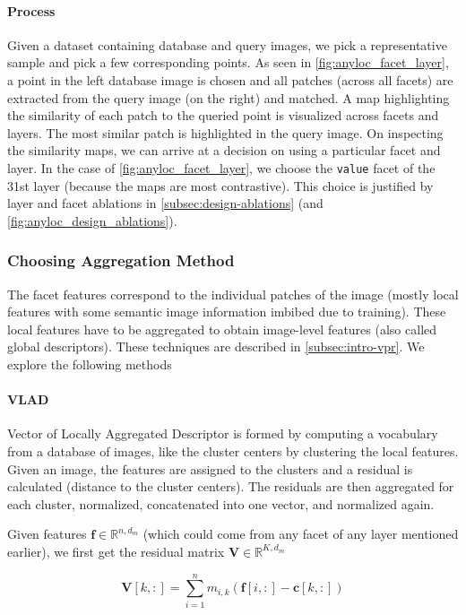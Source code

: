 \paragraph{Process} Given a dataset containing database and query
images, we pick a representative sample and pick a few corresponding
points. As seen in \cref{fig:anyloc_facet_layer}, a point in the left
database image is chosen and all patches (across all facets) are
extracted from the query image (on the right) and matched. A map
highlighting the similarity of each patch to the queried point is
visualized across facets and layers. The most similar patch is
highlighted in the query image. On inspecting the similarity maps, we
can arrive at a decision on using a particular facet and layer. In the
case of \cref{fig:anyloc_facet_layer}, we choose the \texttt{value}
facet of the 31st layer (because the maps are most contrastive). This
choice is justified by layer and facet ablations in
\cref{subsec:design-ablations} (and
\cref{fig:anyloc_design_ablations}).


\subsubsection{Choosing Aggregation Method}

The facet features correspond to the individual patches of the image
(mostly local features with some semantic image information imbibed
due to training). These local features have to be aggregated to obtain
image-level features (also called global descriptors). These
techniques are described in \cref{subsec:intro-vpr}. We explore the 
following methods

\paragraph{VLAD} Vector of Locally Aggregated Descriptor is formed by
computing a vocabulary from a database of images, like the cluster
centers by clustering the local features. Given an image, the features
are assigned to the clusters and a residual is calculated (distance to
the cluster centers). The residuals are then aggregated for each
cluster, normalized, concatenated into one vector, and normalized
again.

Given features $\mathbf{f} \in \mathbb{R}^{n, d_m}$ (which could come 
from any facet of any layer mentioned earlier), we first get the
residual matrix $\mathbf{V} \in \mathbb{R}^{K, d_m}$

\begin{equation}
    \mathbf{V}[k, :] = \sum_{i=1}^{n} m_{i,k} (\mathbf{f}[i, :] - 
        \mathbf{c}[k, :])
\end{equation}

